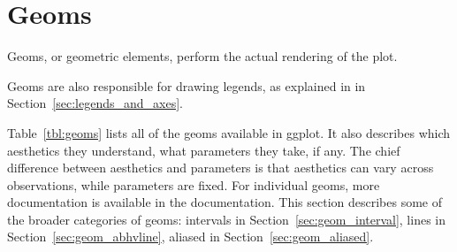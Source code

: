 \section{Geoms}
\label{sec:geom}


Geoms, or geometric elements, perform the actual rendering of the plot.

Geoms are also responsible for drawing legends, as explained in in Section~\ref{sec:legends_and_axes}.

Table~\ref{tbl:geoms} lists all of the geoms available in ggplot.  It also describes which aesthetics they understand, what parameters they take, if any.  The chief difference between aesthetics and parameters is that aesthetics can vary across observations, while parameters are fixed.  For individual geoms, more documentation is available in the documentation.  This section describes some of the broader categories of geoms: intervals in Section~\ref{sec:geom_interval}, lines in Section~\ref{sec:geom_abhvline}, aliased in Section~\ref{sec:geom_aliased}.

